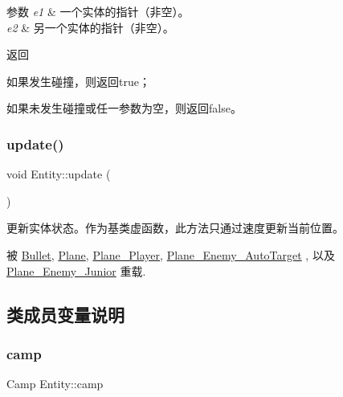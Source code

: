 \begin{DoxyParams}{参数}
{\em e1} & 一个实体的指针（非空）。\\
\hline
{\em e2} & 另一个实体的指针（非空）。 \\
\hline
\end{DoxyParams}
\begin{DoxyReturn}{返回}

\begin{DoxyItemize}
\item 如果发生碰撞，则返回true；
\item 如果未发生碰撞或任一参数为空，则返回false。 
\end{DoxyItemize}
\end{DoxyReturn}
\mbox{\label{class_entity_a00b6eeaf99b35c8f8b10b5fbfc1baf4f}} 
\subsubsection{\texorpdfstring{update()}{update()}}
{\footnotesize\ttfamily void Entity\+::update (\begin{DoxyParamCaption}{ }\end{DoxyParamCaption})\hspace{0.3cm}{\ttfamily [virtual]}}



更新实体状态。作为基类虚函数，此方法只通过速度更新当前位置。 



被 \hyperlink{class_bullet_a32f4a0611fe2dd245fee955d14ca1f68}{Bullet}, \hyperlink{class_plane_a7fbb07f76503fe057772e01f542afc32}{Plane}, \hyperlink{class_plane___player_ae68c08ce11fad9fd164c00eb4db6b348}{Plane\+\_\+\+Player}, \hyperlink{class_plane___enemy___auto_target_a79e6eda540d282205ce6151ae0b304ca}{Plane\+\_\+\+Enemy\+\_\+\+Auto\+Target} , 以及 \hyperlink{class_plane___enemy___junior_a686e46c9927793dd07235cac72d52405}{Plane\+\_\+\+Enemy\+\_\+\+Junior} 重载.



\subsection{类成员变量说明}
\mbox{\label{class_entity_a5326accd49d3817310ec90692b9da3df}} 
\subsubsection{\texorpdfstring{camp}{camp}}
{\footnotesize\ttfamily Camp Entity\+::camp\hspace{0.3cm}{\ttfamily [protected]}}



